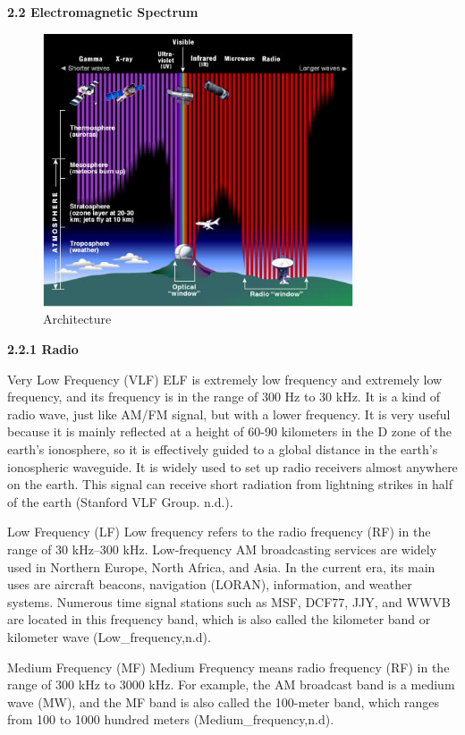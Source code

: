 \documentclass[conference]{IEEEtran}
\begin{document}
\small {\bf 2.2 Electromagnetic Spectrum\rm} 

\begin{figure}[htbp]
	\centerline{\includegraphics[width=260pt]{images/1.2.png}}
	\caption{Architecture}
	\label{fig3}
\end{figure}

{\bf 2.2.1	Radio\rm}

Very Low Frequency (VLF)
ELF is extremely low frequency and extremely low frequency, and its frequency is in the range of 300 Hz to 30 kHz. It is a kind of radio wave, just like AM/FM signal, but with a lower frequency. It is very useful because it is mainly reflected at a height of 60-90 kilometers in the D zone of the earth's ionosphere, so it is effectively guided to a global distance in the earth's ionospheric waveguide. It is widely used to set up radio receivers almost anywhere on the earth. This signal can receive short radiation from lightning strikes in half of the earth (Stanford VLF Group. n.d.).

Low Frequency (LF)
Low frequency refers to the radio frequency (RF) in the range of 30 kHz–300 kHz. Low-frequency AM broadcasting services are widely used in Northern Europe, North Africa, and Asia. In the current era, its main uses are aircraft beacons, navigation (LORAN), information, and weather systems. Numerous time signal stations such as MSF, DCF77, JJY, and WWVB are located in this frequency band, which is also called the kilometer band or kilometer wave (Low_frequency,n.d).

Medium Frequency (MF)
Medium Frequency means radio frequency (RF) in the range of 300 kHz to 3000 kHz. For example, the AM broadcast band is a medium wave (MW), and the MF band is also called the 100-meter band, which ranges from 100 to 1000 hundred meters (Medium_frequency,n.d).
\end{document}
